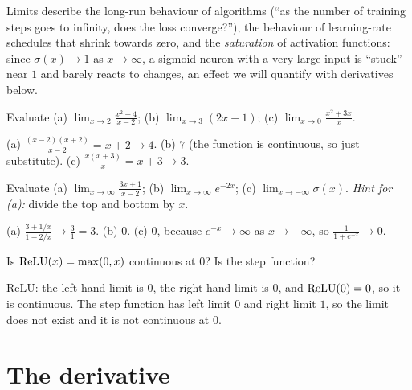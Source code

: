 \begin{mlnote}
Limits describe the long-run behaviour of algorithms (``as the number of
training steps goes to infinity, does the loss converge?''), the behaviour of
learning-rate schedules that shrink towards zero, and the \emph{saturation} of
activation functions: since $\sigma(x) \to 1$ as $x\to\infty$, a sigmoid neuron
with a very large input is ``stuck'' near $1$ and barely reacts to changes,
an effect we will quantify with derivatives below.
\end{mlnote}

\sectionexercises

\begin{exercise}
Evaluate (a) $\lim_{x\to2}\frac{x^2 - 4}{x - 2}$; (b) $\lim_{x\to3}(2x + 1)$;
(c) $\lim_{x\to0}\frac{x^2 + 3x}{x}$.
\end{exercise}
\begin{solution}
(a) $\tfrac{(x-2)(x+2)}{x-2} = x + 2 \to 4$. (b) $7$ (the function is
continuous, so just substitute). (c) $\tfrac{x(x + 3)}{x} = x + 3 \to 3$.
\end{solution}

\begin{exercise}
Evaluate (a) $\lim_{x\to\infty}\frac{3x + 1}{x - 2}$; (b)
$\lim_{x\to\infty}e^{-2x}$; (c) $\lim_{x\to-\infty}\sigma(x)$.
\emph{Hint for (a):} divide the top and bottom by $x$.
\end{exercise}
\begin{solution}
(a) $\tfrac{3 + 1/x}{1 - 2/x} \to \tfrac{3}{1} = 3$. (b) $0$. (c) $0$, because
$e^{-x}\to\infty$ as $x \to -\infty$, so $\tfrac{1}{1 + e^{-x}} \to 0$.
\end{solution}

\begin{exercise}
Is $\operatorname{ReLU}(x) = \max(0, x)$ continuous at $0$? Is the step function?
\end{exercise}
\begin{solution}
ReLU: the left-hand limit is $0$, the right-hand limit is $0$, and
$\operatorname{ReLU}(0) = 0$, so it is continuous. The step function has left limit $0$ and
right limit $1$, so the limit does not exist and it is not continuous at $0$.
\end{solution}

\section{The derivative}\label{sec:derivative}

